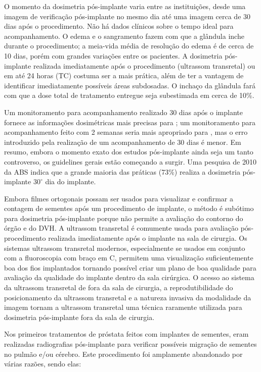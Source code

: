 \documentclass[11pt,a4paper]{article}
\begin{document}
	O momento da dosimetria pós-implante varia entre as instituições, desde uma imagem de verificação pós-implante no mesmo dia até uma imagem cerca de 30 dias após o procedimento. Não há dados clínicos sobre o tempo ideal para acompanhamento. O edema e o sangramento fazem com que a glândula inche durante o procedimento; a meia-vida média de resolução do edema é de cerca de 10 dias, porém com grandes variações entre os pacientes. A dosimetria pós-implante realizada imediatamente após o procedimento (ultrassom transretal) ou em até 24 horas (TC) costuma ser a mais prática, além de ter a vantagem de identificar imediatamente possíveis áreas subdosadas. O inchaço da glândula fará com que a dose total de tratamento entregue seja subestimada em cerca de 10\%.

	Um monitoramento para acompanhamento realizado 30 dias após o implante fornece as informações dosimétricas mais precisas para ; um monitoramento para acompanhamento feito com 2 semanas seria mais apropriado para , mas o erro introduzido pela realização de um acompanhamento de 30 dias é menor. Em resumo, embora o momento exato dos estudos pós-implante ainda seja um tanto controverso, os guidelines gerais estão começando a surgir. Uma pesquisa de 2010 da ABS indica que a grande maioria das práticas (73\%) realiza a dosimetria pós-implante $\mathrm{30^{\circ}}$ dia do implante.

	Embora filmes ortogonais possam ser usados para visualizar e confirmar a contagem de sementes após um procedimento de implante, o método é subótimo para dosimetria pós-implante porque não permite a avaliação do contorno do órgão e do DVH. A ultrassom transretal é comumente usada para avaliação pós-procedimento realizada imediatamente após o implante na sala de cirurgia. Os sistemas ultrassom transretal modernos, especialmente se usados em conjunto com a fluoroscopia com braço em C, permitem uma visualização suficientemente boa dos fios implantados tornando possível criar um plano de boa qualidade para avaliação da qualidade do implante dentro da sala cirúrgica. O acesso ao sistema da ultrassom transretal de fora da sala de cirurgia, a reprodutibilidade do posicionamento da ultrassom transretal e a natureza invasiva da modalidade da imagem tornam a ultrassom transretal uma técnica raramente utilizada para dosimetria pós-implante fora da sala de cirurgia.

	Nos primeiros tratamentos de próstata feitos com implantes de sementes, eram realizadas radiografias pós-implante para verificar possíveis migração de sementes no pulmão e/ou cérebro. Este procedimento foi amplamente abandonado por várias razões, sendo elas:
\end{document}
